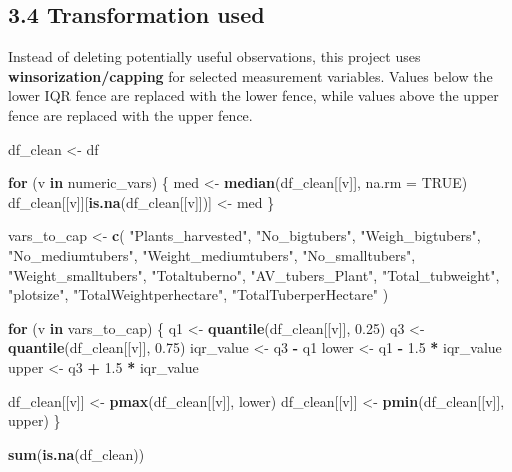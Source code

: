 \documentclass[
]{article}
\newenvironment{Shaded}{\begin{snugshade}}{\end{snugshade}}
\newcommand{\AttributeTok}[1]{\textcolor[rgb]{0.13,0.29,0.53}{#1}}
\newcommand{\ConstantTok}[1]{\textcolor[rgb]{0.56,0.35,0.01}{#1}}
\newcommand{\ControlFlowTok}[1]{\textcolor[rgb]{0.13,0.29,0.53}{\textbf{#1}}}
\newcommand{\FloatTok}[1]{\textcolor[rgb]{0.00,0.00,0.81}{#1}}
\newcommand{\FunctionTok}[1]{\textcolor[rgb]{0.13,0.29,0.53}{\textbf{#1}}}
\newcommand{\NormalTok}[1]{#1}
\newcommand{\OtherTok}[1]{\textcolor[rgb]{0.56,0.35,0.01}{#1}}
\newcommand{\SpecialCharTok}[1]{\textcolor[rgb]{0.81,0.36,0.00}{\textbf{#1}}}
\newcommand{\StringTok}[1]{\textcolor[rgb]{0.31,0.60,0.02}{#1}}
\begin{document}
\subsection{3.4 Transformation used}\label{transformation-used}

Instead of deleting potentially useful observations, this project uses
\textbf{winsorization/capping} for selected measurement variables.
Values below the lower IQR fence are replaced with the lower fence,
while values above the upper fence are replaced with the upper fence.

\begin{Shaded}
\begin{Highlighting}[]
\NormalTok{df\_clean }\OtherTok{\textless{}{-}}\NormalTok{ df}

\ControlFlowTok{for}\NormalTok{ (v }\ControlFlowTok{in}\NormalTok{ numeric\_vars) \{}
\NormalTok{  med }\OtherTok{\textless{}{-}} \FunctionTok{median}\NormalTok{(df\_clean[[v]], }\AttributeTok{na.rm =} \ConstantTok{TRUE}\NormalTok{)}
\NormalTok{  df\_clean[[v]][}\FunctionTok{is.na}\NormalTok{(df\_clean[[v]])] }\OtherTok{\textless{}{-}}\NormalTok{ med}
\NormalTok{\}}

\NormalTok{vars\_to\_cap }\OtherTok{\textless{}{-}} \FunctionTok{c}\NormalTok{(}
  \StringTok{"Plants\_harvested"}\NormalTok{, }\StringTok{"No\_bigtubers"}\NormalTok{, }\StringTok{"Weigh\_bigtubers"}\NormalTok{,}
  \StringTok{"No\_mediumtubers"}\NormalTok{, }\StringTok{"Weight\_mediumtubers"}\NormalTok{, }\StringTok{"No\_smalltubers"}\NormalTok{,}
  \StringTok{"Weight\_smalltubers"}\NormalTok{, }\StringTok{"Totaltuberno"}\NormalTok{, }\StringTok{"AV\_tubers\_Plant"}\NormalTok{,}
  \StringTok{"Total\_tubweight"}\NormalTok{, }\StringTok{"plotsize"}\NormalTok{, }\StringTok{"TotalWeightperhectare"}\NormalTok{,}
  \StringTok{"TotalTuberperHectare"}
\NormalTok{)}

\ControlFlowTok{for}\NormalTok{ (v }\ControlFlowTok{in}\NormalTok{ vars\_to\_cap) \{}
\NormalTok{  q1 }\OtherTok{\textless{}{-}} \FunctionTok{quantile}\NormalTok{(df\_clean[[v]], }\FloatTok{0.25}\NormalTok{)}
\NormalTok{  q3 }\OtherTok{\textless{}{-}} \FunctionTok{quantile}\NormalTok{(df\_clean[[v]], }\FloatTok{0.75}\NormalTok{)}
\NormalTok{  iqr\_value }\OtherTok{\textless{}{-}}\NormalTok{ q3 }\SpecialCharTok{{-}}\NormalTok{ q1}
\NormalTok{  lower }\OtherTok{\textless{}{-}}\NormalTok{ q1 }\SpecialCharTok{{-}} \FloatTok{1.5} \SpecialCharTok{*}\NormalTok{ iqr\_value}
\NormalTok{  upper }\OtherTok{\textless{}{-}}\NormalTok{ q3 }\SpecialCharTok{+} \FloatTok{1.5} \SpecialCharTok{*}\NormalTok{ iqr\_value}

\NormalTok{  df\_clean[[v]] }\OtherTok{\textless{}{-}} \FunctionTok{pmax}\NormalTok{(df\_clean[[v]], lower)}
\NormalTok{  df\_clean[[v]] }\OtherTok{\textless{}{-}} \FunctionTok{pmin}\NormalTok{(df\_clean[[v]], upper)}
\NormalTok{\}}

\FunctionTok{sum}\NormalTok{(}\FunctionTok{is.na}\NormalTok{(df\_clean))}
\end{Highlighting}
\end{Shaded}
\end{document}
